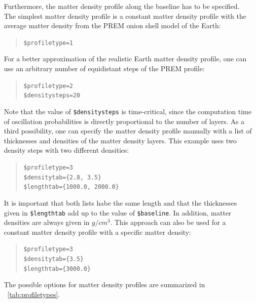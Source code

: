 Furthermore, the matter density profile along the baseline
has to be specified. The simplest matter density profile is a constant matter density profile with the average matter density from the PREM\cite{Stacey} onion shell model of the Earth:
\begin{quote}
{\tt \$profiletype=1 }
\end{quote}
%
For a better approximation of the realistic Earth matter density profile, one can use an arbitrary number of equidistant steps of the PREM profile:
\begin{quote}
{\tt \$profiletype=2 } \\
{\tt \$densitysteps=20 }
\end{quote}
Note that the value of {\tt \$densitysteps} is time-critical, since the
computation time of oscillation probabilities is directly 
proportional to the number of layers.
%
As a  third possibility, one can specify the matter density profile 
manually with a list of thicknesses and densities of the matter density layers. This example uses two density steps with two different densities:
\begin{quote}
{\tt \$profiletype=3 } \\
{\tt \$densitytab=\{2.8, 3.5\}}\\
{\tt \$lengthtab=\{1000.0, 2000.0\}}\\
\end{quote}
It is important that both lists habe the same length and that the  thicknesses given in  {\tt \$lengthtab} add up to the value of
{\tt \$baseline}. In addition, matter densities are always given in $g/cm^3$.
%
This approach can also be used for a constant matter density profile with
a specific matter density:
\begin{quote}
{\tt \$profiletype=3 } \\
{\tt \$densitytab=\{3.5\}}\\
{\tt \$lengthtab=\{3000.0\}}\\
\end{quote}
The possible options for matter density profiles are summarized in \Tab~\ref{tab:profiletypes}.

